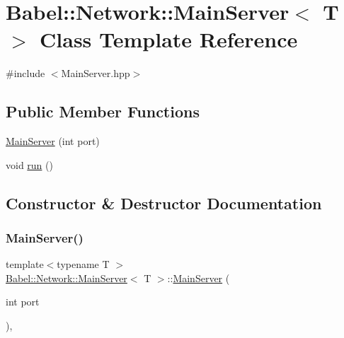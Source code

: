 \hypertarget{classBabel_1_1Network_1_1MainServer}{}\section{Babel\+:\+:Network\+:\+:Main\+Server$<$ T $>$ Class Template Reference}
\label{classBabel_1_1Network_1_1MainServer}


{\ttfamily \#include $<$Main\+Server.\+hpp$>$}

\subsection*{Public Member Functions}
\begin{DoxyCompactItemize}
\item 
\hyperlink{classBabel_1_1Network_1_1MainServer_a367a86c02dbbd4ceaf1ba8e5318ac74e}{Main\+Server} (int port)
\item 
void \hyperlink{classBabel_1_1Network_1_1MainServer_a177ad77cca5acf93a383d99ad2600e13}{run} ()
\end{DoxyCompactItemize}


\subsection{Constructor \& Destructor Documentation}
\mbox{\label{classBabel_1_1Network_1_1MainServer_a367a86c02dbbd4ceaf1ba8e5318ac74e}} 
\subsubsection{\texorpdfstring{Main\+Server()}{MainServer()}}
{\footnotesize\ttfamily template$<$typename T $>$ \\
\hyperlink{classBabel_1_1Network_1_1MainServer}{Babel\+::\+Network\+::\+Main\+Server}$<$ T $>$\+::\hyperlink{classBabel_1_1Network_1_1MainServer}{Main\+Server} (\begin{DoxyParamCaption}\item[{int}]{port }\end{DoxyParamCaption})\hspace{0.3cm}{\ttfamily [inline]}, {\ttfamily [explicit]}}

